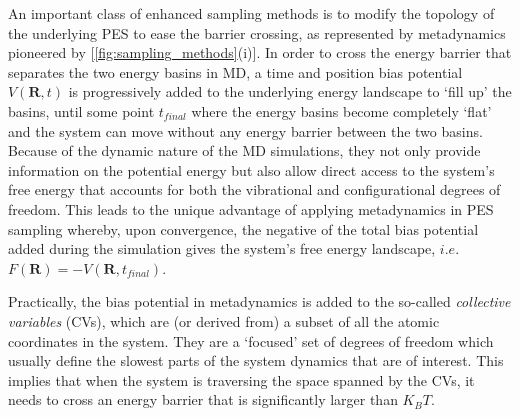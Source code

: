 An important class of enhanced sampling methods is to modify the topology of the underlying PES to ease the barrier crossing, as represented by metadynamics pioneered by \citet{laio2002escaping} [\cref{fig:sampling_methods}(i)].  In order to cross the energy barrier that separates the two energy basins in MD, a time and position bias potential $V(\bm{R},t)$ is progressively added to the underlying energy landscape to `fill up' the basins, until some point $t_{final}$ where the energy basins become completely `flat' and the system can move without any energy barrier between the two basins.  Because of the dynamic nature of the MD simulations, they not only provide information on the potential energy but also allow direct access to the system's free energy that accounts for both the vibrational and configurational degrees of freedom. This leads to the unique advantage of applying metadynamics in PES sampling whereby, upon convergence, the negative of the total bias potential added during the simulation gives the system's free energy landscape, $i.e.$ $F(\bm{R})=-V(\bm{R},t_{final})$.

Practically, the bias potential in  metadynamics  is added to the so-called \emph{collective variables} (CVs), which are  (or derived from) a subset of all the atomic coordinates in the system. They are a `focused' set of degrees of freedom which usually define the slowest parts of the system dynamics that are of interest. This implies that when the system is traversing the space spanned by the CVs, it needs to cross an energy barrier that is significantly larger than $K_B T$. 

